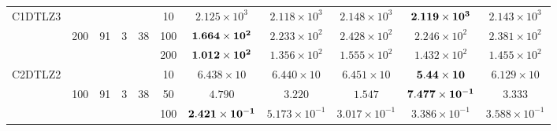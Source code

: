 \documentclass[../main/main]{subfiles}
\begin{document}
\begin{table}[htbp]
\begin{tabular}{c|ccccc|c|c|c|c|c}
\hline
\multirow{3}{*}{C1DTLZ3} &       && &       & 10 &$2.125 \times 10^{3}$ & $2.118 \times 10^{3}$ & $2.148 \times 10^{3}$ & $\bf{2.119 \times 10^{3}}$ & $2.143 \times 10^{3}$\\
                                          &200 & 91 &3 & 38 & 100 &$\bf{1.664 \times 10^{2}}$ & $2.233 \times 10^{2}$ & $2.428 \times 10^{2}$ & $2.246 \times 10^{2}$ & $2.381 \times 10^{2}$\\
				   &        &       && &200 &$\bf{1.012 \times 10^{2}}$ & $1.356 \times 10^{2}$ & $1.555 \times 10^{2}$ & $1.432 \times 10^{2}$ & $1.455 \times 10^{2}$\\
\hline
\multirow{3}{*}{C2DTLZ2} &  &&      &       & 10 &$6.438 \times 10$ & $6.440 \times 10$ & $6.451 \times 10$ & $\bf{5.44 \times 10}$ & $6.129 \times 10$\\
  				   & 100 & 91 & 3 & 38&50 &$4.790$ & $3.220$ & $1.547$ & $\bf{7.477 \times 10^{-1}}$ & $3.333$\\
		convex		   &        &     &&   &100 &$\bf{2.421 \times 10^{-1}}$ & $5.173 \times 10^{-1}$ & $3.017 \times 10^{-1}$ & $3.386 \times 10^{-1}$ & $3.588 \times 10^{-1}$\\


\end{tabular}
\end{table}
\end{document}
